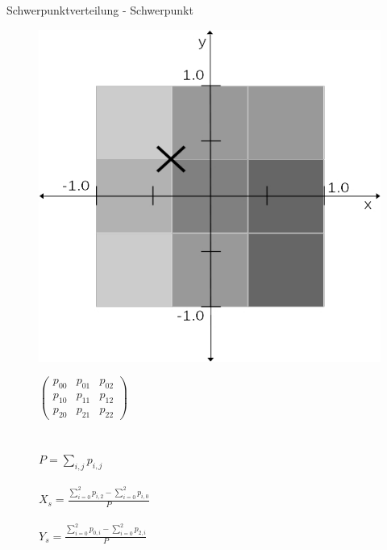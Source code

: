 \documentclass[10pt]{beamer}
\begin{document}
\begin{frame}{Schwerpunktverteilung - Schwerpunkt}
\begin{figure}
    \begin{minipage}[c]{0.5\linewidth}
        \includegraphics[width=\linewidth]{schwerpunkt_ansatz.jpg}
    \end{minipage}
    \hfill
    \begin{minipage}[c]{0.3\linewidth}
        $\begin{pmatrix}
            p_{00} & p_{01} & p_{02}\\
            p_{10} & p_{11} & p_{12}\\
            p_{20} & p_{21} & p_{22}
        \end{pmatrix}$
        \\\\\\
        $P = \sum_{i,j} p_{i,j}$
        \\\\
        $X_s = \frac{\sum_{i=0}^{2} p_{i,2} - \sum_{i=0}^{2} p_{i,0}}{P}$
        \\\\
        $Y_s = \frac{\sum_{i=0}^{2} p_{0,i} - \sum_{i=0}^{2} p_{2,i}}{P}$
    \end{minipage}
\end{figure}
\end{frame}
\end{document}

